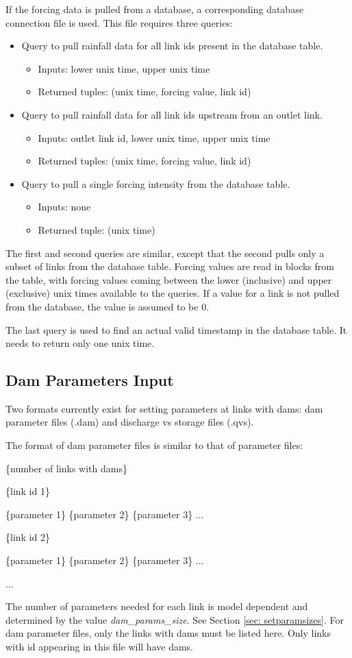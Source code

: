 \documentclass[12pt]{article}
\newenvironment{codeindent}
{\begin{list}{}
        {\setlength{\leftmargin}{.1in}}
        \item[]
}
{\end{list}}
\begin{document}
If the forcing data is pulled from a database, a corresponding database connection file is used. This file requires three queries:
\begin{itemize}
  \item Query to pull rainfall data for all link ids present in the database table.
  \begin{itemize}
   \item Inputs: lower unix time, upper unix time
   \item Returned tuples: (unix time, forcing value, link id)
  \end{itemize}
  \item Query to pull rainfall data for all link ids upstream from an outlet link.
  \begin{itemize}
   \item Inputs: outlet link id, lower unix time, upper unix time
   \item Returned tuples: (unix time, forcing value, link id)
  \end{itemize}
  \item Query to pull a single forcing intensity from the database table.
  \begin{itemize}
   \item Inputs: none
   \item Returned tuple: (unix time)
  \end{itemize}
\end{itemize}
The first and second queries are similar, except that the second pulls only a subset of links from the database table. Forcing values are read in blocks from the table, with forcing values coming between the lower (inclusive) and upper (exclusive) unix times available to the queries. If a value for a link is not pulled from the database, the value is assumed to be 0.

The last query is used to find an actual valid timestamp in the database table. It needs to return only one unix time.


\subsection{Dam Parameters Input} \label{sec: dam parameters input}

Two formats currently exist for setting parameters at links with dams: dam parameter files (.dam) and discharge vs storage files (.qvs).

The format of dam parameter files is similar to that of parameter files:
\begin{codeindent}
 \{number of links with dams\}
 
 \{link id 1\}
 
 \{parameter 1\} \{parameter 2\} \{parameter 3\} ...
 
 \{link id 2\}
 
 \{parameter 1\} \{parameter 2\} \{parameter 3\} ...
 
 ...
\end{codeindent}
The number of parameters needed for each link is model dependent and determined by the value \emph{dam\_params\_size}. See Section \ref{sec: setparamsizes}. For dam parameter files, only the links with dams must be listed here. Only links with id appearing in this file will have dams.
\end{document}
